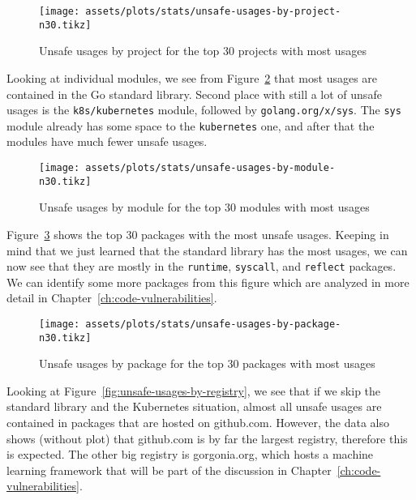 \begin{figure}[ht]
    \centering
    {\scriptsize \texttt{[image: assets/plots/stats/unsafe-usages-by-project-n30.tikz]}}
    \caption{Unsafe usages by project for the top 30 projects with most usages}
    \label{fig:unsafe-usages-by-project-n30}
\end{figure}

Looking at individual modules, we see from Figure~\ref{fig:unsafe-usages-by-module-n30} that most usages are contained
in the Go standard library.
Second place with still a lot of unsafe usages is the \texttt{k8s/kubernetes} module, followed by
\texttt{golang.org/x/sys}.
The \texttt{sys} module already has some space to the \texttt{kubernetes} one, and after that the modules have much
fewer unsafe usages.

\begin{figure}[ht]
    \centering
    {\scriptsize \texttt{[image: assets/plots/stats/unsafe-usages-by-module-n30.tikz]}}
    \caption{Unsafe usages by module for the top 30 modules with most usages}
    \label{fig:unsafe-usages-by-module-n30}
\end{figure}

Figure~\ref{fig:unsafe-usages-by-package-n30} shows the top 30 packages with the most unsafe usages.
Keeping in mind that we just learned that the standard library has the most usages, we can now see that they are mostly
in the \texttt{runtime}, \texttt{syscall}, and \texttt{reflect} packages.
We can identify some more packages from this figure which are analyzed in more detail in Chapter~\ref{ch:code-vulnerabilities}.

\begin{figure}[ht]
    \centering
    {\scriptsize \texttt{[image: assets/plots/stats/unsafe-usages-by-package-n30.tikz]}}
    \caption{Unsafe usages by package for the top 30 packages with most usages}
    \label{fig:unsafe-usages-by-package-n30}
\end{figure}

Looking at Figure~\ref{fig:unsafe-usages-by-registry}, we see that if we skip the standard library and the Kubernetes
situation, almost all unsafe usages are contained in packages that are hosted on github.com.
However, the data also shows (without plot) that github.com is by far the largest registry, therefore this is expected.
The other big registry is gorgonia.org, which hosts a machine learning framework that will be part of the discussion in
Chapter~\ref{ch:code-vulnerabilities}.

